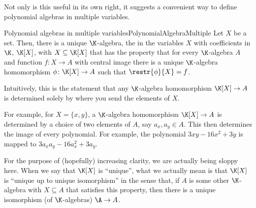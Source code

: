 Not only is this useful in its own right, it suggests a convenient way to define polynomial algebras in multiple variables.
\begin{thm}{Polynomial algebras in multiple variables}{PolynomialAlgebraMultiple}
	Let $X$ be a set.  Then, there is a unique $\K$-algebra, the  in the variables $X$ with coefficients in $\K$, $\K [X]$\index[notation]{$\K [X]$}, with $X\subseteq \K [X]$ that has the property that for every $\K$-algebra $A$ and function $f\colon X\rightarrow A$ with central image there is a unique $\K$-algebra homomorphism $\phi \colon \K [X]\rightarrow A$ such that $\restr{\phi}{X}=f$.
	\begin{rmk}
		Intuitively, this is the statement that any $\K$-algebra homomorphism $\K [X]\rightarrow A$ is determined solely by where you send the elements of $X$.
		
		For example, for $X=\{ x,y\}$, a $\K$-algebra homomorphism $\K [X]\rightarrow A$ is determined by a choice of two elements of $A$, say $a_x,a_y\in A$.  This then determines the image of every polynomial.  For example, the polynomial $3xy-16x^2+3y$ is mapped to $3a_xa_y-16a_x^2+3a_y$.
	\end{rmk}
	\begin{rmk}
		For the purpose of (hopefully) increasing clarity, we are actually being sloppy here.  When we say that $\K [X]$ is ``unique'', what we actually mean is that $\K [X]$ is ``unique up to unique isomorphism'' in the sense that, if $A$ is some other $\K$-algebra with $X\subseteq A$ that satisfies this property, then there is a unique isomorphism (of $\K$-algebras) $\A \rightarrow A$.
		

\end{rmk}
\end{thm}

